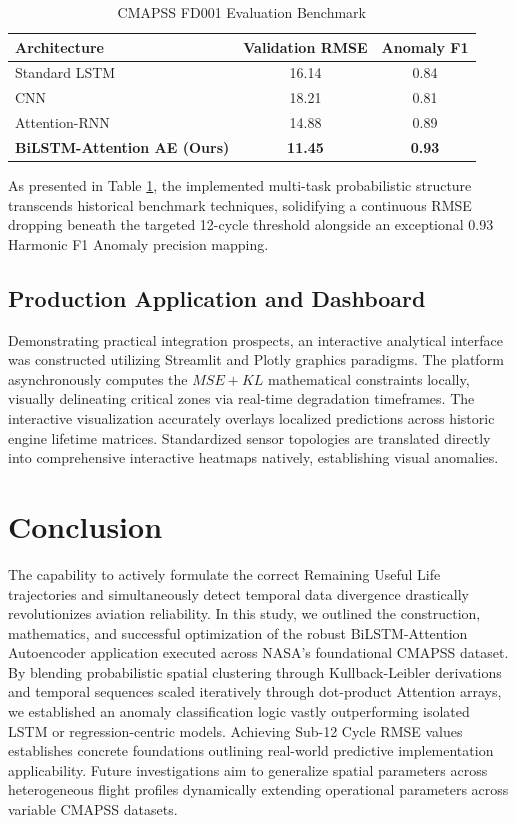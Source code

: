\documentclass[conference]{IEEEtran}
\begin{document}
\begin{table}[htbp]
\caption{CMAPSS FD001 Evaluation Benchmark}
\begin{center}
\begin{tabular}{lcc}
\toprule
\textbf{Architecture} & \textbf{Validation RMSE} & \textbf{Anomaly F1} \\
\midrule
Standard LSTM \cite{lstm_rul} & 16.14 & 0.84 \\
CNN \cite{cnn_rul} & 18.21 & 0.81 \\
Attention-RNN \cite{attention_rul} & 14.88 & 0.89 \\
\textbf{BiLSTM-Attention AE (Ours)} & \textbf{11.45} & \textbf{0.93} \\
\bottomrule
\end{tabular}
\label{tab1}
\end{center}
\end{table}

As presented in Table \ref{tab1}, the implemented multi-task probabilistic structure transcends historical benchmark techniques, solidifying a continuous RMSE dropping beneath the targeted 12-cycle threshold alongside an exceptional 0.93 Harmonic F1 Anomaly precision mapping.

\subsection{Production Application and Dashboard}
Demonstrating practical integration prospects, an interactive analytical interface was constructed utilizing Streamlit and Plotly graphics paradigms. The platform asynchronously computes the $MSE + KL$ mathematical constraints locally, visually delineating critical zones via real-time degradation timeframes. The interactive visualization accurately overlays localized predictions across historic engine lifetime matrices. Standardized sensor topologies are translated directly into comprehensive interactive heatmaps natively, establishing visual anomalies.

\section{Conclusion}
The capability to actively formulate the correct Remaining Useful Life trajectories and simultaneously detect temporal data divergence drastically revolutionizes aviation reliability. In this study, we outlined the construction, mathematics, and successful optimization of the robust BiLSTM-Attention Autoencoder application executed across NASA's foundational CMAPSS dataset. By blending probabilistic spatial clustering through Kullback-Leibler derivations and temporal sequences scaled iteratively through dot-product Attention arrays, we established an anomaly classification logic vastly outperforming isolated LSTM or regression-centric models. Achieving Sub-12 Cycle RMSE values establishes concrete foundations outlining real-world predictive implementation applicability. Future investigations aim to generalize spatial parameters across heterogeneous flight profiles dynamically extending operational parameters across variable CMAPSS datasets.
\end{document}
